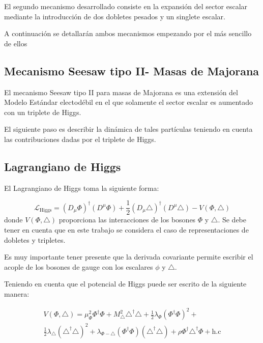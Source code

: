 \documentclass[12pt]{article}
\begin{document}
El segundo mecanismo desarrollado consiste en la expansión del sector escalar mediante la introducción de dos dobletes pesados y un singlete escalar.

A continuación se detallarán ambos mecanismos empezando por el más sencillo de ellos


\subsection{Mecanismo Seesaw tipo II- Masas de Majorana}

El mecanismo Seesaw tipo II para masas de Majorana es una extensión del Modelo Estándar electodébil en el que solamente el sector escalar es aumentado con un triplete de Higgs.

El siguiente paso es describir la dinámica de tales partículas teniendo en cuenta las contribuciones dadas por el triplete de Higgs. 

\subsection{Lagrangiano de Higgs}
El Lagrangiano de Higgs toma la siguiente forma: 

\begin{equation}
    \mathcal{L}_{\text{Higgs}}= (D_\mu\Phi)^\dagger(D^\mu\Phi)+ \frac{1}{2}(D_\mu\triangle)^\dagger(D^\mu\triangle) - V(\Phi, \triangle)
    \label{eq:Higgs}
\end{equation}
donde $ V(\Phi, \triangle)$  proporciona las interacciones de los bosones \(\Phi\) y \(\triangle\). 
 Se debe tener en cuenta que en este trabajo se considera el caso de representaciones de dobletes y tripletes. 
 
Es muy importante tener presente que la derivada covariante permite escribir el acople de los bosones de gauge con los escalares \(\phi\) y \(\triangle\).

Teniendo en cuenta que el potencial de Higgs puede ser escrito de la siguiente manera: 

\begin{equation}
    \begin{aligned}
    \label{eq:POtencialMAjorana}
V(\Phi, \triangle)= \mu^2_\Phi\Phi^\dagger\Phi + M^2_\triangle\triangle^\dagger\triangle +  \frac{1}{2}\lambda_\Phi (\Phi^\dagger\Phi)^2 + \\ 
\frac{1}{2}\lambda_\triangle (\triangle^\dagger\triangle)^2 + \lambda_{\Phi-\triangle} (\Phi^\dagger\Phi)(\triangle^\dagger\triangle)+ \rho\Phi^\dagger\triangle^\dagger\Phi + \text{h.c}
    \end{aligned}
\end{equation}
\end{document}
